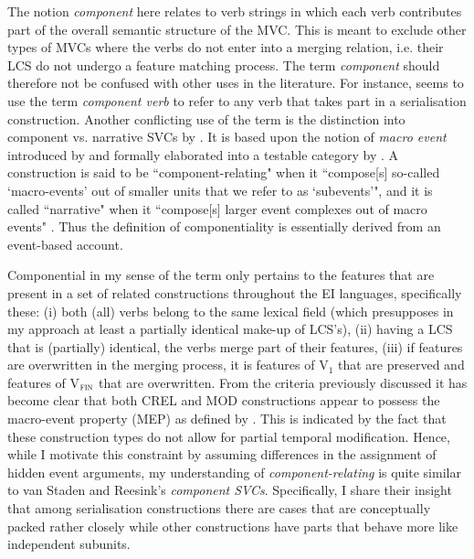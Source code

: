 The notion \textit{component} here relates to verb strings in which each verb contributes part of the overall semantic structure of the MVC. This is meant to exclude other types of MVCs where the verbs do not enter into a merging relation, i.e. their LCS do not undergo a feature matching process. The term \textit{component} should therefore not be confused with other uses in the literature. For instance, \citet{dixon2006serial} seems to use the term \textit{component verb} to refer to any verb that takes part in a serialisation construction. Another conflicting use of the term is the distinction into component vs. narrative SVCs by \citet{vanstaden2008serial}. It is based upon the notion of \textit{macro event} introduced by \citet{talmy2000toward} and formally elaborated into a testable category by \citet{bohnemeyer2007principles, bohnemeyer2011}. A construction is said to be ``component-relating" when it ``compose[s] so-called `macro-events’
out of smaller units that we refer to as `subevents’", and it is called ``narrative" when it ``compose[s] larger event complexes out of macro events" \citep[28]{vanstaden2008serial}. Thus the definition of componentiality is essentially derived from an event-based account. 

Componential in my sense of the term only pertains to the features that are present in a set of related constructions throughout the EI languages, specifically these: (i) both (all) verbs belong to the same lexical field (which presupposes in my approach at least a partially identical make-up of LCS's), (ii) having a LCS that is (partially) identical, the verbs merge part of their features, (iii) if features are overwritten in the merging process, it is features of V$_{1}$ that are preserved and features of V$_{\textsc{fin}}$ that are overwritten. From the criteria previously discussed it has become clear that both CREL and MOD constructions appear to possess the macro-event property (MEP) as defined by \citet{bohnemeyer2007principles}. This is indicated by the fact that these construction types do not allow for partial temporal modification. Hence, while I motivate this constraint by assuming differences in the assignment of hidden event arguments, my understanding of \textit{component-relating} is quite similar to van Staden and Reesink's \textit{component SVCs}. Specifically, I share their insight that among serialisation constructions there are cases that are conceptually packed rather closely while other constructions have parts that behave more like independent subunits.

